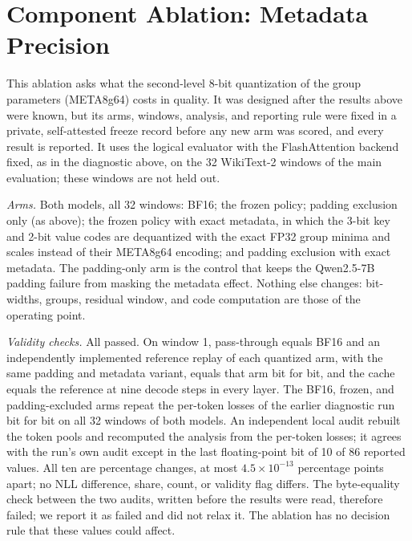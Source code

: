 \documentclass{article}
\begin{document}
\FloatBarrier  %
\section{Component Ablation: Metadata Precision}
\label{app:ablation}

This ablation asks what the second-level 8-bit quantization of the group parameters (META8g64) costs
in quality. It was designed after the results above were known, but its arms, windows, analysis, and
reporting rule were fixed in a private, self-attested freeze record before any new arm was scored, and
every result is reported. It uses the logical evaluator with the FlashAttention backend fixed, as in the
diagnostic above, on the 32 WikiText-2 windows of the main evaluation; these windows are not held out.

\emph{Arms.} Both models, all 32 windows: BF16; the frozen policy; padding exclusion only (as above);
the frozen policy with exact metadata, in which the 3-bit key and 2-bit value codes are dequantized
with the exact FP32 group minima and scales instead of their META8g64 encoding; and padding exclusion
with exact metadata. The padding-only arm is the control that keeps the Qwen2.5-7B padding failure from
masking the metadata effect. Nothing else changes: bit-widths, groups, residual window, and code
computation are those of the operating point.

\emph{Validity checks.} All passed. On window 1, pass-through equals BF16 and an independently
implemented reference replay of each quantized arm, with the same padding and metadata variant, equals
that arm bit for bit, and the cache equals the reference at nine decode steps in every layer. The BF16,
frozen, and padding-excluded arms repeat the per-token losses of the earlier diagnostic run bit for bit
on all 32 windows of both models. An independent local audit rebuilt the token pools and recomputed the
analysis from the per-token losses; it agrees with the run's own audit except in the last floating-point
bit of 10 of 86 reported values. All ten are percentage changes, at most $4.5\times10^{-13}$ percentage
points apart; no NLL difference, share, count, or validity flag differs. The byte-equality check
between the two audits, written before the results were read, therefore failed; we report it as failed
and did not relax it. The ablation has no decision rule that these values could affect.
\end{document}
